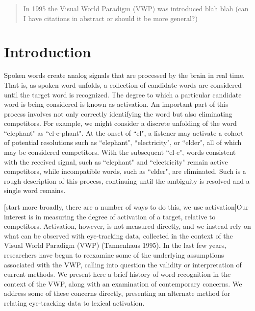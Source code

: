 
%

\begin{abstract}
In 1995 the Visual World Paradigm (VWP) was introduced blah blah (can I have citations in abstract or should it be more general?)
\end{abstract}



\section{Introduction}

Spoken words create analog signals that are processed by the brain in real time. That is, as spoken word unfolds, a collection of candidate words are considered until the target word is recognized. The degree to which a particular candidate word is being considered is known as activation. An important part of this process involves not only correctly identifying the word but also eliminating competitors. For example, we might consider a discrete unfolding of the word ``elephant" as ``el-e-phant". At the onset of ``el", a listener may activate a cohort of potential resolutions such as ``elephant", ``electricity", or ``elder", all of which may be considered competitors. With the subsequent ``el-e", words consistent with the received signal, such as ``elephant" and ``electricity" remain active competitors, while incompatible words, such as ``elder", are eliminated. Such is a rough description of this process, continuing until the ambiguity is resolved and a single word remains.



[start more broadly, there are a number of ways to do this, we use activation]Our interest is in measuring the degree of activation of a target, relative to competitors. Activation, however, is not measured directly, and we instead rely on what can be observed with eye-tracking data, collected in the context of the Visual World Paradigm (VWP) (Tannenhaus 1995)\cite{tanenhaus1995integration}. In the last few years, researchers have begun to reexamine some of the underlying assumptions associated with the VWP, calling into question the validity or interpretation of current methods. We present here a brief history of word recognition in the context of the VWP, along with an examination of contemporary concerns. We address some of these concerns directly, presenting an alternate method for relating eye-tracking data to lexical activation.


